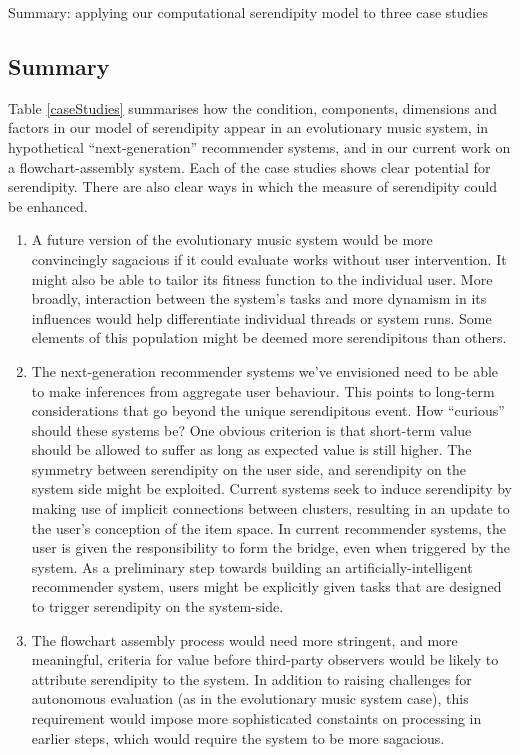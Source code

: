 \begin{table}[p]
\caption{Summary: applying our computational serendipity model to three case studies\label{caseStudies}}
\end{table}

\subsection{Summary}

Table \ref{caseStudies} summarises how the condition, components,
dimensions and factors in our model of serendipity appear in an
evolutionary music system, in hypothetical ``next-generation''
recommender systems, and in our current work on a flowchart-assembly
system.  Each of the case studies shows clear potential for
serendipity.  There are also clear ways in which the measure of
serendipity could be enhanced.

\begin{enumerate}
\item A future version of the evolutionary music system would be more
  convincingly sagacious if it could evaluate works without user
  intervention.  It might also be able to tailor its fitness function
  to the individual user.  More broadly, interaction between the
  system's tasks and more dynamism in its influences would help
  differentiate individual threads or system runs.  Some elements of
  this population might be deemed more serendipitous than others.

\item The next-generation recommender systems we've envisioned need to
  be able to make inferences from aggregate user behaviour.  This
  points to long-term considerations that go beyond the unique
  serendipitous event.  How ``curious'' should these systems be?  One
  obvious criterion is that short-term value should be allowed to
  suffer as long as expected value is still higher.  The symmetry
  between serendipity on the user side, and serendipity on the system
  side might be exploited.  Current systems seek to induce serendipity
  by making use of implicit connections between clusters, resulting in
  an update to the user's conception of the item space.  In current
  recommender systems, the user is given the responsibility to form
  the bridge, even when triggered by the system.  As a preliminary
  step towards building an artificially-intelligent recommender
  system, users might be explicitly given tasks that are designed to
  trigger serendipity on the system-side.

\item The flowchart assembly process would need more stringent, and
  more meaningful, criteria for value before third-party observers
  would be likely to attribute serendipity to the system.  In addition
  to raising challenges for autonomous evaluation (as in the
  evolutionary music system case), this requirement would impose more
  sophisticated constaints on processing in earlier steps, which would
  require the system to be more sagacious.
\end{enumerate}

